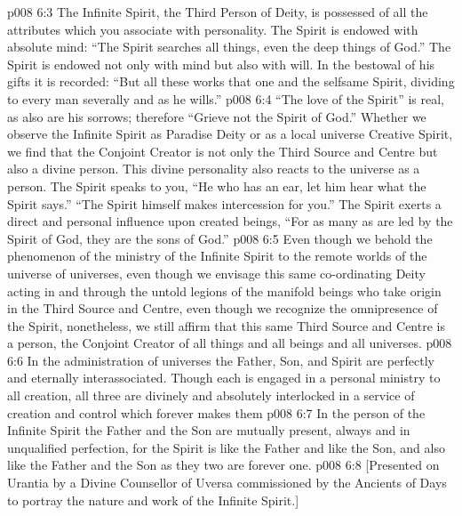 \vs p008 6:3 The Infinite Spirit, the Third Person of Deity, is possessed of all the attributes which you associate with personality. The Spirit is endowed with absolute mind: “The Spirit searches all things, even the deep things of God.” The Spirit is endowed not only with mind but also with will. In the bestowal of his gifts it is recorded: “But all these works that one and the selfsame Spirit, dividing to every man severally and as he wills.”
\vs p008 6:4 “The love of the Spirit” is real, as also are his sorrows; therefore “Grieve not the Spirit of God.” Whether we observe the Infinite Spirit as Paradise Deity or as a local universe Creative Spirit, we find that the Conjoint Creator is not only the Third Source and Centre but also a divine person. This divine personality also reacts to the universe as a person. The Spirit speaks to you, “He who has an ear, let him hear what the Spirit says.” “The Spirit himself makes intercession for you.” The Spirit exerts a direct and personal influence upon created beings, “For as many as are led by the Spirit of God, they are the sons of God.”
\vs p008 6:5 Even though we behold the phenomenon of the ministry of the Infinite Spirit to the remote worlds of the universe of universes, even though we envisage this same co\hyp{}ordinating Deity acting in and through the untold legions of the manifold beings who take origin in the Third Source and Centre, even though we recognize the omnipresence of the Spirit, nonetheless, we still affirm that this same Third Source and Centre is a person, the Conjoint Creator of all things and all beings and all universes.
\vs p008 6:6 \pc In the administration of universes the Father, Son, and Spirit are perfectly and eternally interassociated. Though each is engaged in a personal ministry to all creation, all three are divinely and absolutely interlocked in a service of creation and control which forever makes them 
\vs p008 6:7 In the person of the Infinite Spirit the Father and the Son are mutually present, always and in unqualified perfection, for the Spirit is like the Father and like the Son, and also like the Father and the Son as they two are forever one.
\vsetoff
\vs p008 6:8 [Presented on Urantia by a Divine Counsellor of Uversa commissioned by the Ancients of Days to portray the nature and work of the Infinite Spirit.]
